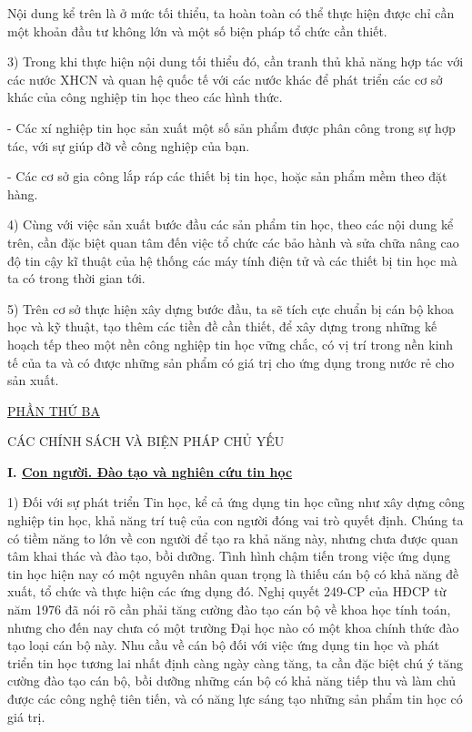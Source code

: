 \documentclass[11pt, a4paper, reqno, oneside]{book}
\begin{document}
Nội dung kể trên là ở mức tối thiểu, ta hoàn toàn có thể thực hiện được chỉ cần một khoản đầu tư không lớn và một số biện pháp tổ chức cần thiết.


3)	Trong khi thực hiện nội dung tối thiểu đó, cần tranh thủ khả năng hợp tác với các nước XHCN và quan hệ quốc tế với các nước khác để phát triển các cơ sở khác của công nghiệp tin học theo các hình thức.


- Các xí nghiệp tin học sản xuất một số sản phẩm được phân công trong sự hợp tác, với sự giúp đỡ về công nghiệp của bạn.


- Các cơ sở gia công lắp ráp các thiết bị tin học, hoặc sản phẩm mềm theo đặt hàng.


4)	Cùng với việc sản xuất bước đầu các sản phẩm tin học, theo các nội dung kể trên, cần đặc biệt quan tâm đến việc tổ chức các bảo hành và sửa chữa nâng cao độ tin cậy kĩ thuật của hệ thống các máy tính điện tử và các thiết bị tin học mà ta có trong thời gian tới.


5)	Trên cơ sở thực hiện xây dựng bước đầu, ta sẽ tích cực chuẩn bị cán bộ khoa học và kỹ thuật, tạo thêm các tiền đề cần thiết, để xây dựng trong những kế hoạch tếp theo một nền công nghiệp tin học vững chắc, có vị trí trong nền kinh tế của ta và có được những sản phẩm có giá trị cho ứng dụng trong nước rẻ cho sản xuất.


\begin{center}
\underline{ PHẦN THỨ BA}
\end{center}
 

\begin{center}
CÁC CHÍNH SÁCH VÀ BIỆN PHÁP CHỦ YẾU
\end{center}

\textbf{I. \underline{ Con người. Đào tạo và nghiên cứu tin học }}


1) Đối với sự phát triển Tin học, kể cả ứng dụng tin học cũng như xây dựng công nghiệp tin học, khả năng trí tuệ của con người đóng vai trò quyết định. Chúng ta có tiềm năng to lớn về con người để tạo ra khả năng này, nhưng chưa được quan tâm khai thác và đào tạo, bồi dưỡng. Tình hình chậm tiến trong việc ứng dụng tin học hiện nay có một nguyên nhân quan trọng là thiếu cán bộ có khả năng đề xuất, tổ chức và thực hiện các ứng dụng đó. Nghị quyết 249-CP của HĐCP từ năm 1976 đã nói rõ cần phải tăng cường đào tạo cán bộ về khoa học tính toán, nhưng cho đến nay chưa có một trường Đại học nào có một khoa chính thức đào tạo loại cán bộ này. Nhu cầu về cán bộ đối với việc ứng dụng tin học và phát triển tin học tương lai nhất định càng ngày càng tăng, ta cần đặc biệt chú ý tăng cường đào tạo cán bộ, bồi dưỡng những cán bộ có khả năng tiếp thu và làm chủ được các công nghệ tiên tiến, và có năng lực sáng tạo những sản phẩm tin học có giá trị. 
\end{document}
